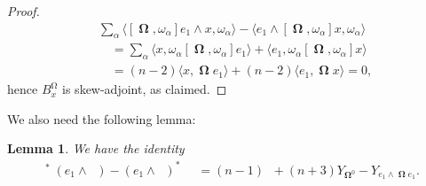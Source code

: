 \documentclass[12pt]{amsart}
\numberwithin{numbering}{section}
\theoremstyle{plain}
\newtheorem{lem}[numbering]{Lemma}
\theoremstyle{definition}
\theoremstyle{remark}
\numberwithin{equation}{section}
\DeclareMathOperator{\nv}{\nabla_{\mathbb{V}}}
\DeclareMathOperator{\nhs}{\nabla_{\mathbb{H}^{\mg}}}
\DeclareMathOperator{\xs}{\mathbb{X}^{\mg}}
\DeclareMathOperator{\oo}{\mathbf{\Omega}}
\DeclareMathOperator{\mg}{\Omega}
\begin{document}
\begin{proof}
\begin{align*}
&\sum_\alpha \langle [\oo, \omega_\alpha] e_1 \wedge x, \omega_\alpha \rangle - \langle e_1 \wedge [\oo, \omega_\alpha] x, \omega_\alpha \rangle \\
&\quad = \sum_\alpha \langle x, \omega_\alpha [\oo, \omega_\alpha] e_1 \rangle + \langle e_1, \omega_\alpha [\oo, \omega_\alpha] x \rangle \\ 
&\quad = (n-2) \langle x, \oo e_1 \rangle + (n-2) \langle e_1, \oo x \rangle = 0,
\end{align*}
hence $B_x^{\mg}$ is skew-adjoint, as claimed.
\end{proof}

We also need the following lemma:
\begin{lem} \label{lem:struct_mag3}
We have the identity 
\begin{align*}
\nv^* (e_1 \wedge \nhs) - (e_1 \wedge \nhs)^* \nv 
&= (n-1) \xs + (n+3) Y_{\oo^0} - Y_{e_1 \wedge \oo e_1}. 
\end{align*}
\end{lem}
\end{document}
